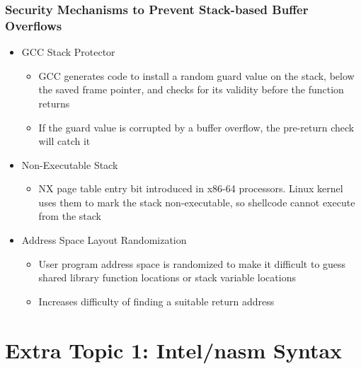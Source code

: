 \documentclass[11pt,xcolor=dvipsnames]{beamer}
\begin{document}
\begin{frame}[fragile,t]
\frametitle{Security Mechanisms to Prevent Stack-based Buffer Overflows}
\begin{itemize}
  \item GCC Stack Protector
  \begin{itemize}
    \item GCC generates code to install a random guard value on the stack, below the saved frame pointer, and checks for its validity before the function returns
    \item If the guard value is corrupted by a buffer overflow, the pre-return check will catch it
  \end{itemize}
  \pause
  \item Non-Executable Stack
  \begin{itemize}
    \item NX page table entry bit introduced in x86-64 processors. Linux kernel uses them to mark the stack non-executable, so shellcode cannot execute from the stack
  \end{itemize}
  \pause
  \item Address Space Layout Randomization
  \begin{itemize}
    \item User program address space is randomized to make it difficult to guess shared library function locations or stack variable locations
    \item Increases difficulty of finding a suitable return address
  \end{itemize}
\end{itemize}
\end{frame}

\section{Extra Topic 1: Intel/nasm Syntax}
\end{document}
